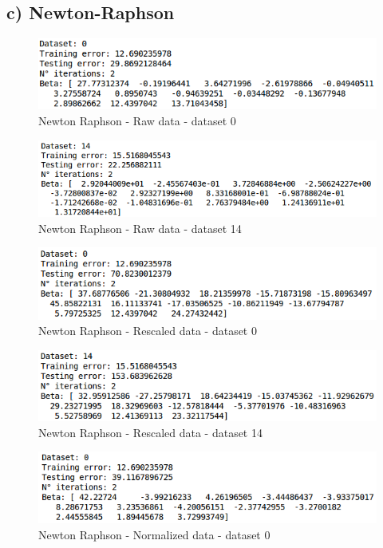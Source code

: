 \documentclass[spanish, fleqn]{article}
\begin{document}
\begin{enumerate}
\subsection{c) Newton-Raphson}

\begin{figure}[!htpb]
\centering
 \includegraphics[scale=0.5]{nr_raw0.png}
 \caption{Newton Raphson - Raw data - dataset 0}
\end{figure}

\begin{figure}[!htpb]
\centering
 \includegraphics[scale=0.5]{nr_raw14.png}
 \caption{Newton Raphson - Raw data - dataset 14}
\end{figure}

\begin{figure}[!htpb]
\centering
 \includegraphics[scale=0.5]{nr_rescaled0.png}
 \caption{Newton Raphson - Rescaled data - dataset 0}
\end{figure}

\begin{figure}[!htpb]
\centering
 \includegraphics[scale=0.5]{nr_rescaled14.png}
 \caption{Newton Raphson - Rescaled data - dataset 14}
\end{figure}

\begin{figure}[!htpb]
\centering
 \includegraphics[scale=0.5]{nr_norm0.png}
 \caption{Newton Raphson - Normalized data - dataset 0}
\end{figure}


\end{enumerate}
\end{document}
